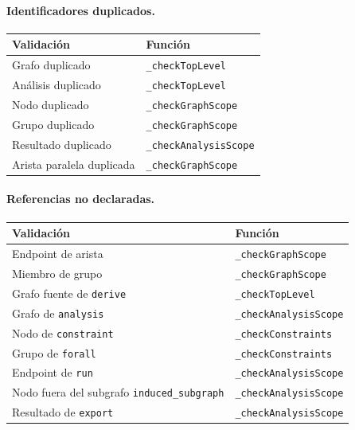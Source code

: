\documentclass[11pt,a4paper]{article}
\newcommand{\code}[1]{\texttt{#1}}
\begin{document}
\paragraph{Identificadores duplicados.}
\begin{center}
\begin{tabular}{@{}ll@{}}
\toprule
\textbf{Validación} & \textbf{Función} \\
\midrule
Grafo duplicado            & \code{\_checkTopLevel} \\
Análisis duplicado         & \code{\_checkTopLevel} \\
Nodo duplicado             & \code{\_checkGraphScope} \\
Grupo duplicado            & \code{\_checkGraphScope} \\
Resultado duplicado        & \code{\_checkAnalysisScope} \\
Arista paralela duplicada  & \code{\_checkGraphScope} \\
\bottomrule
\end{tabular}
\end{center}

\paragraph{Referencias no declaradas.}
\begin{center}
\begin{tabular}{@{}ll@{}}
\toprule
\textbf{Validación} & \textbf{Función} \\
\midrule
Endpoint de arista       & \code{\_checkGraphScope} \\
Miembro de grupo         & \code{\_checkGraphScope} \\
Grafo fuente de \code{derive} & \code{\_checkTopLevel} \\
Grafo de \code{analysis} & \code{\_checkAnalysisScope} \\
Nodo de \code{constraint}& \code{\_checkConstraints} \\
Grupo de \code{forall}   & \code{\_checkConstraints} \\
Endpoint de \code{run}   & \code{\_checkAnalysisScope} \\
Nodo fuera del subgrafo \code{induced\_subgraph} & \code{\_checkAnalysisScope} \\
Resultado de \code{export} & \code{\_checkAnalysisScope} \\
\bottomrule
\end{tabular}
\end{center}
\end{document}
